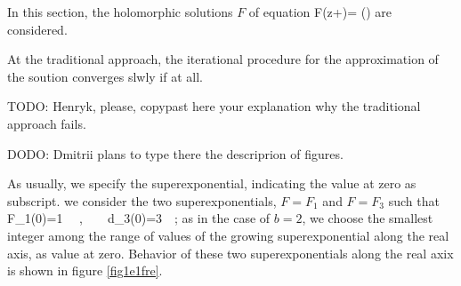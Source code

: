 \documentclass{article}
\begin{document}
%
\Large
In this section, the holomorphic solutions $F$ of equation
\be
F(z\!+)= \exp\!\left(\right)
are considered.

At the traditional approach, the iterational procedure for the approximation of the soution 
converges slwly if at all.

TODO: Henryk, please, copypast here your explanation why the traditional approach fails.

DODO: Dmitrii plans to type there the descriprion of figures.

As usually, we specify the superexponential, indicating the value at zero as subscript.
we consider the two superexponentials, $F=F_1$ and $F=F_3$ such that
\be
F_1(0)=1 ~~,~~~~d_3(0)=3~~;
as in the case of $b=2$, we choose the smallest integer among the range of values of the 
growing superexponential along the real axis, as value at zero.
Behavior of these two superexponentials along the real axix is shown in 
figure \ref{fig1e1fre}.
\end{document}
